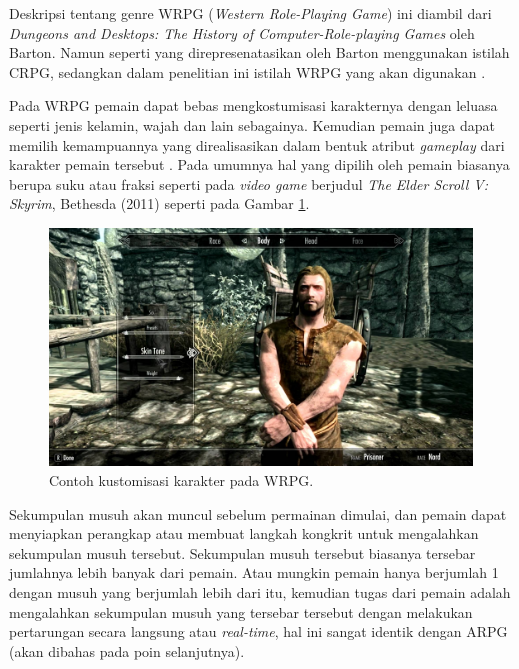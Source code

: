Deskripsi tentang genre WRPG (\textit{Western Role-Playing Game}) ini diambil dari \textit{Dungeons and Desktops: The History of Computer-Role-playing Games} oleh Barton. Namun seperti yang direpresenatasikan oleh Barton menggunakan istilah CRPG, sedangkan dalam penelitian ini istilah WRPG yang akan digunakan \citep{barton2019}.
\vspace{1ex}

Pada WRPG pemain dapat bebas mengkostumisasi karakternya dengan leluasa seperti jenis kelamin, wajah dan lain sebagainya. Kemudian pemain juga dapat memilih kemampuannya yang direalisasikan dalam bentuk atribut \textit{gameplay} dari karakter pemain tersebut \citep{barton2019}. Pada umumnya hal yang dipilih oleh pemain biasanya berupa suku atau fraksi seperti pada \textit{video game} berjudul \textit{The Elder Scroll V: Skyrim}, Bethesda (2011) seperti pada Gambar \ref{fig:skyrim}.
\vspace{1ex}

\begin{figure} [!h] \centering
	\includegraphics[scale=0.16]{img/skyrim.jpg}
	\caption{Contoh kustomisasi karakter pada WRPG.}
	\label{fig:skyrim}
\end{figure}

Sekumpulan musuh akan muncul sebelum permainan dimulai, dan pemain dapat menyiapkan perangkap atau membuat langkah kongkrit untuk mengalahkan sekumpulan  musuh tersebut. Sekumpulan musuh tersebut biasanya tersebar jumlahnya lebih banyak dari pemain. Atau mungkin pemain hanya berjumlah 1 dengan musuh yang berjumlah lebih dari itu, kemudian tugas dari pemain adalah mengalahkan sekumpulan musuh yang tersebar tersebut dengan melakukan pertarungan secara langsung atau \textit{real-time}, hal ini sangat identik dengan ARPG (akan dibahas pada poin selanjutnya).
\vspace{1ex}

